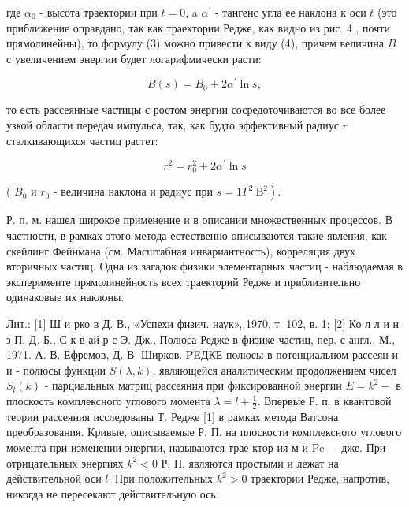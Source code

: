 \documentclass[10pt]{article}
\begin{document}
где $\alpha_{0}$ - высота траектории при $t=0$, a $\alpha^{\prime}$ - тангенс угла ее наклона к оси $t$ (это приближение оправдано, так как траектории Редже, как видно из рис. 4 , почти прямолинейны), то формулу (3) можно привести к виду (4), причем величина $B$ с увеличением энергии будет логарифмически расти:



\[

B(s)=B_{0}+2 \alpha^{\prime} \ln s,

\]



то есть рассеянные частицы с ростом энергии сосредоточиваются во все более узкой области передач импульса, так, как будто эффективный радиус $r$ сталкивающихся частиц растет:



\[

r^{2}=r_{0}^{2}+2 \alpha^{\prime} \ln s

\]



( $B_{0}$ и $r_{0}$ - величина наклона и радиус при $\left.s=1 \Gamma^{2} \mathrm{~B}^{2}\right)$.



Р. п. м. нашел широкое применение и в описании множественных процессов. В частности, в рамках этого метода естественно описываются такие явления, как скейлинг Фейнмана (см. Масштабная инвариантность), корреляция двух вторичных частиц. Одна из загадок физики элементарных частиц - наблюдаемая в эксперименте прямолинейность всех траекторий Редже и приблизительно одинаковые их наклоны.



Лит.: [1] Ш и рко в Д. В., «Успехи физич. наук», 1970, т. 102, в. 1; [2] Ко л л и н з П. Д. Б., С к в ай р с Э. Дж., Полюса Редже в физике частиц, пер. с англ., М., 1971. А. В. Ефремов, Д. В. Ширков. PEДКЕ полюсы в потенциальном рассеян и и - полюсы функции $S(\lambda, k)$, являющейся аналитическим продолжением чисел $S_{l}(k)$ - парциальных матриц рассеяния при фиксированной энергии $E=k^{2}-$ в плоскость комплексного углового момента $\lambda=l+\frac{1}{2}$. Впервые Р. п. в квантовой теории рассеяния исследованы Т. Редже [1] в рамках метода Ватсона преобразования. Кривые, описываемые Р. П. на плоскости комплексного углового момента при изменении энергии, называются трае ктор ия м и $\mathrm{Pe}-$ дже. При отрицательных энергиях $k^{2}<0$ Р. П. являются простыми и лежат на действительной оси $l$. При положительных $k^{2}>0$ траектории Редже, напротив, никогда не пересекают действительную ось.
\end{document}
